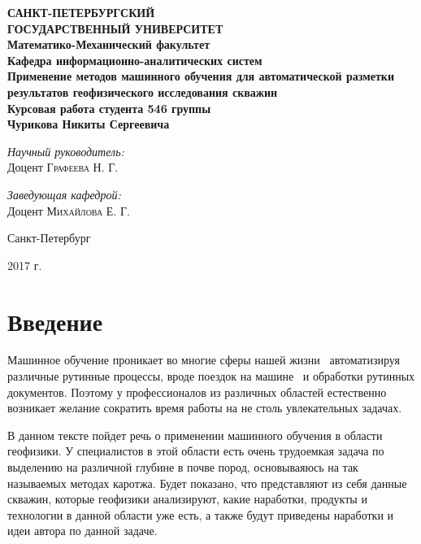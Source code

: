 \documentclass[aps,%
12pt,%
final,%
oneside,
onecolumn,%
musixtex, %
superscriptaddress,%
centertags]{article} %
\begin{document}
\begin{titlepage}
\begin{center}
\textbf{\Large САНКТ-ПЕТЕРБУРГСКИЙ \\ ГОСУДАРСТВЕННЫЙ УНИВЕРСИТЕТ} \\[1.0cm]
\textbf{\large Математико-Механический факультет} \\[0.2cm]
\textbf{\large Кафедра информационно-аналитических систем}\\[3.5cm]

\textbf{\LARGE Применение методов машинного обучения для автоматической разметки результатов геофизического исследования скважин}\\[1.0cm]
\textbf{\Large Курсовая работа студента 546 группы} \\[0.2cm]
\textbf{\Large Чурикова Никиты Сергеевича} \\[3.5cm]

\begin{flushright} \large
\emph{Научный руководитель:} \\
Доцент \textsc{Графеева Н. Г.}
\end{flushright}
\begin{flushright} \large
\emph{Заведующая кафедрой:} \\
Доцент \textsc{Михайлова Е. Г.}
\end{flushright}
\vfill

{\large {Санкт-Петербург}} \par
{\large {2017 г.}}
\end{center}
\end{titlepage}

\tableofcontents

\section{Введение}
Машинное обучение проникает во многие сферы нашей жизни~\cite{overview-of-ml} автоматизируя различные рутинные процессы, вроде поездок на машине~\cite{ai-cars} и обработки рутинных документов. Поэтому у профессионалов из различных областей естественно возникает желание сократить время работы на не столь увлекательных задачах.

В данном тексте пойдет речь о применении машинного обучения в области геофизики. У специалистов в этой области есть очень трудоемкая задача по выделению на различной глубине в почве пород, основываяюсь на так называемых методах каротжа. Будет показано, что представляют из себя данные скважин, которые геофизики анализируют, какие наработки, продукты и технологии в данной области уже есть, а также будут приведены наработки и идеи автора по данной задаче.
\end{document}
